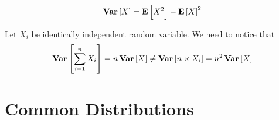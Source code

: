 \begin{theorem}
    \begin{equation}
        \variance{X} = \expect{X^2} - \expect{X}^2
    \end{equation}
\end{theorem}

\begin{theorem}
    Let $X_i$ be identically independent random variable. We need to notice that 
    \begin{equation*}
        \variance{\sum_{i=1}^n X_i} = n \variance{X} \neq \variance{n \times X_i} = n^2 \variance{X}
    \end{equation*}    
\end{theorem}



\section{Common Distributions}


